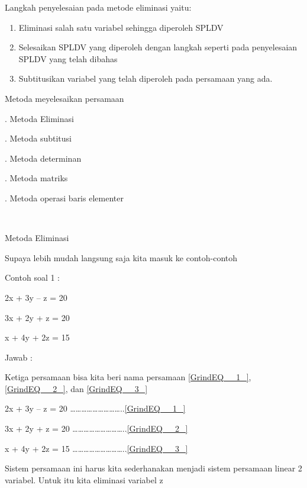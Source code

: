 \documentclass[11pt,fleqn]{book} %
\begin{document}
\noindent Langkah penyelesaian pada metode eliminasi yaitu:

\begin{enumerate}
\item  Eliminasi salah satu variabel sehingga diperoleh SPLDV

\item  Selesaikan SPLDV yang diperoleh dengan langkah seperti pada penyelesaian SPLDV yang telah dibahas

\item  Subtitusikan variabel yang telah diperoleh pada persamaan yang ada.
\end{enumerate}

\noindent 

\noindent 

\noindent 

\noindent 

\noindent Metoda meyelesaikan persamaan

. Metoda Eliminasi

. Metoda subtitusi

. Metoda determinan

. Metoda matriks

. Metoda operasi baris elementer

\noindent ~

\noindent Metoda Eliminasi

\noindent Supaya lebih mudah langsung saja kita masuk ke contoh-contoh

\noindent Contoh soal 1 :

\noindent 2x + 3y -- z = 20

\noindent 3x + 2y + z = 20

\noindent x + 4y + 2z = 15

\noindent Jawab :

\noindent Ketiga persamaan bisa kita beri nama persamaan \eqref{GrindEQ__1_}, \eqref{GrindEQ__2_}, dan \eqref{GrindEQ__3_}

\noindent 2x + 3y -- z = 20 {\dots}{\dots}{\dots}{\dots}{\dots}{\dots}{\dots}{\dots}{\dots}..\eqref{GrindEQ__1_}

\noindent 3x + 2y + z = 20 {\dots}{\dots}{\dots}{\dots}{\dots}{\dots}{\dots}{\dots}{\dots}..\eqref{GrindEQ__2_}

\noindent x + 4y + 2z = 15 {\dots}{\dots}{\dots}{\dots}{\dots}{\dots}{\dots}{\dots}{\dots}..\eqref{GrindEQ__3_}

\noindent Sistem persamaan ini harus kita sederhanakan menjadi sistem persamaan linear 2 variabel. Untuk itu kita eliminasi variabel z
\end{document}
